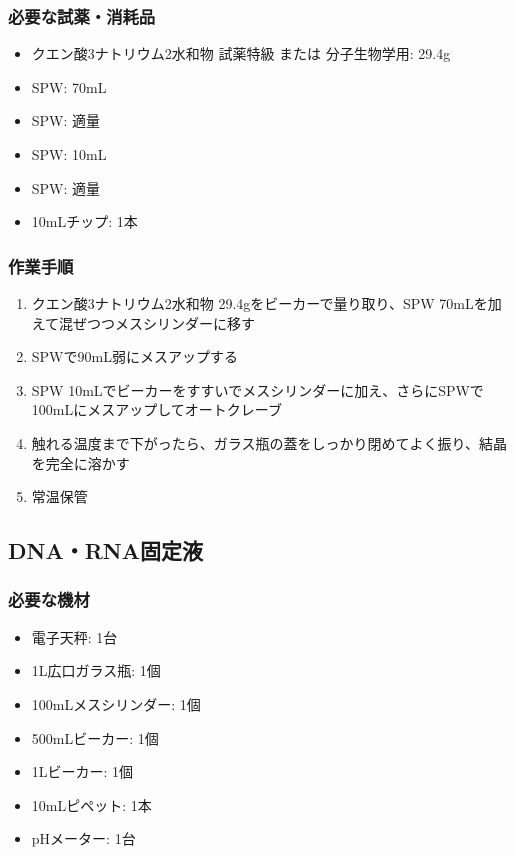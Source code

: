 \documentclass[titlepage,10pt,a4paper,uplatex]{jsbook}
\begin{document}
\subsubsection{必要な試薬・消耗品}
\begin{itemize}
\item クエン酸3ナトリウム2水和物 試薬特級 または 分子生物学用: 29.4g
\item SPW: 70mL
\item SPW: 適量
\item SPW: 10mL
\item SPW: 適量
\item 10mLチップ: 1本
\end{itemize}

\subsubsection{作業手順}
\begin{enumerate}
\item クエン酸3ナトリウム2水和物 29.4gをビーカーで量り取り、SPW 70mLを加えて混ぜつつメスシリンダーに移す
\item SPWで90mL弱にメスアップする
\item SPW 10mLでビーカーをすすいでメスシリンダーに加え、さらにSPWで100mLにメスアップしてオートクレーブ
\item 触れる温度まで下がったら、ガラス瓶の蓋をしっかり閉めてよく振り、結晶を完全に溶かす
\item 常温保管
\end{enumerate}

\subsection{DNA・RNA固定液}

\subsubsection{必要な機材}
\begin{itemize}
\item 電子天秤: 1台
\item 1L広口ガラス瓶: 1個
\item 100mLメスシリンダー: 1個
\item 500mLビーカー: 1個
\item 1Lビーカー: 1個
\item 10mLピペット: 1本
\item pHメーター: 1台
\end{itemize}
\end{document}
